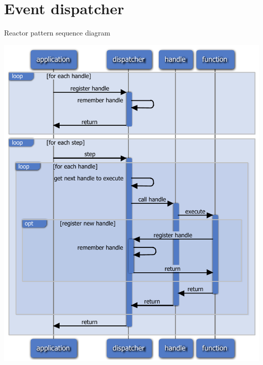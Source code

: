 \documentclass{beamer}
\begin{document}
\section{ Event dispatcher }

\begin{frame} { Reactor pattern sequence diagram }
   \centerline{\includegraphics[height=0.9\textheight]{slides/reactor.pdf}}
\end{frame}
\end{document}
